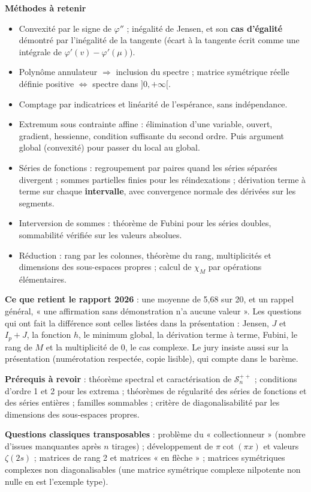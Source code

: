 \documentclass[11pt,a4paper]{article}
\providecommand{\tightlist}{\setlength{\itemsep}{0pt}\setlength{\parskip}{0pt}}
\begin{document}
\textbf{Méthodes à retenir}

\begin{itemize}
\tightlist
\item
  Convexité par le signe de \(\varphi''\) ; inégalité de Jensen, et son \textbf{cas d'égalité} démontré par l'inégalité de la tangente (écart à la tangente écrit comme une intégrale de \(\varphi'(v)-\varphi'(\mu)\)).
\item
  Polynôme annulateur \(\Rightarrow\) inclusion du spectre ; matrice symétrique réelle définie positive \(\iff\) spectre dans \(]0,+\infty[\).
\item
  Comptage par indicatrices et linéarité de l'espérance, sans indépendance.
\item
  Extremum sous contrainte affine : élimination d'une variable, ouvert, gradient, hessienne, condition suffisante du second ordre. Puis argument global (convexité) pour passer du local au global.
\item
  Séries de fonctions : regroupement par paires quand les séries séparées divergent ; sommes partielles finies pour les réindexations ; dérivation terme à terme sur chaque \textbf{intervalle}, avec convergence normale des dérivées sur les segments.
\item
  Interversion de sommes : théorème de Fubini pour les séries doubles, sommabilité vérifiée sur les valeurs absolues.
\item
  Réduction : rang par les colonnes, théorème du rang, multiplicités et dimensions des sous-espaces propres ; calcul de \(\chi_M\) par opérations élémentaires.
\end{itemize}

\textbf{Ce que retient le rapport 2026} : une moyenne de 5,68 sur 20, et un rappel général, « une affirmation sans démonstration n'a aucune valeur ». Les questions qui ont fait la différence sont celles listées dans la présentation : Jensen, \(J\) et \(I_p+J\), la fonction \(h\), le minimum global, la dérivation terme à terme, Fubini, le rang de \(M\) et la multiplicité de \(0\), le cas complexe. Le jury insiste aussi sur la présentation (numérotation respectée, copie lisible), qui compte dans le barème.

\textbf{Prérequis à revoir} : théorème spectral et caractérisation de \(\mathcal S_n^{++}\) ; conditions d'ordre 1 et 2 pour les extrema ; théorèmes de régularité des séries de fonctions et des séries entières ; familles sommables ; critère de diagonalisabilité par les dimensions des sous-espaces propres.

\textbf{Questions classiques transposables} : problème du « collectionneur » (nombre d'issues manquantes après \(n\) tirages) ; développement de \(\pi\cot(\pi x)\) et valeurs \(\zeta(2s)\) ; matrices de rang 2 et matrices « en flèche » ; matrices symétriques complexes non diagonalisables (une matrice symétrique complexe nilpotente non nulle en est l'exemple type).
\end{document}
